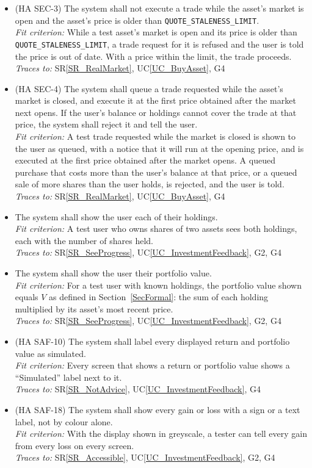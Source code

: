\documentclass[12pt]{article}
\newcommand{\srref}[1]{SR\ref{#1}}
\newcommand{\ucref}[1]{UC\ref{#1}}
\newcounter{reqnum} %
\newcommand{\freq}[4]{%
  \item[FR\refstepcounter{reqnum}\thereqnum \label{#1}:] #2\\
  \textit{Fit criterion:} #3\\
  \textit{Traces to:} #4}
\begin{document}
\begin{itemize}
{  request is submitted more than once.}
  {When a test user submits a trade and the same request is sent again, for
  example by retrying after a dropped connection, exactly one trade is
  recorded.}
  {\srref{SR_RealMarket}, \ucref{UC_BuyAsset}, G4}
\freq{FR_MktNoStaleTrade}
  {(HA SEC-3) The system shall not execute a trade while the asset's market is
  open and the asset's price is older than \texttt{QUOTE\_STALENESS\_LIMIT}.}
  {While a test asset's market is open and its price is older than
  \texttt{QUOTE\_STALENESS\_LIMIT}, a trade request for it is refused and the
  user is told the price is out of date. With a price within the limit, the
  trade proceeds.}
  {\srref{SR_RealMarket}, \ucref{UC_BuyAsset}, G4}
\freq{FR_MktQueueClosed}
  {(HA SEC-4) The system shall queue a trade requested while the asset's
  market is closed, and execute it at the first price obtained after the
  market next opens. If the user's balance or holdings cannot cover the trade
  at that price, the system shall reject it and tell the user.}
  {A test trade requested while the market is closed is shown to the user as
  queued, with a notice that it will run at the opening price, and is executed
  at the first price obtained after the market opens. A queued purchase that
  costs more than the user's balance at that price, or a queued sale of more
  shares than the user holds, is rejected, and the user is told.}
  {\srref{SR_RealMarket}, \ucref{UC_BuyAsset}, G4}
\freq{FR_MktHoldings}
  {The system shall show the user each of their holdings.}
  {A test user who owns shares of two assets sees both holdings, each with the
  number of shares held.}
  {\srref{SR_SeeProgress}, \ucref{UC_InvestmentFeedback}, G2, G4}
\freq{FR_MktPortfolioValue}
  {The system shall show the user their portfolio value.}
  {For a test user with known holdings, the portfolio value shown equals $V$
  as defined in Section~\ref{SecFormal}: the sum of each holding multiplied by
  its asset's most recent price.}
  {\srref{SR_SeeProgress}, \ucref{UC_InvestmentFeedback}, G2, G4}
\freq{FR_MktLabelReturns}
  {(HA SAF-10) The system shall label every displayed return and portfolio
  value as simulated.}
  {Every screen that shows a return or portfolio value shows a ``Simulated''
  label next to it.}
  {\srref{SR_NotAdvice}, \ucref{UC_InvestmentFeedback}, G4}
\freq{FR_MktGainLossLabel}
  {(HA SAF-18) The system shall show every gain or loss with a sign or a text
  label, not by colour alone.}
  {With the display shown in greyscale, a tester can tell every gain from
  every loss on every screen.}
  {\srref{SR_Accessible}, \ucref{UC_InvestmentFeedback}, G2, G4}

\end{itemize}
\end{document}
